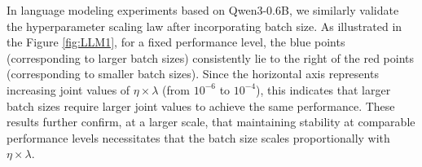 
In language modeling experiments based on Qwen3-0.6B, we similarly validate the hyperparameter scaling law after incorporating batch size. As illustrated in the Figure \ref{fig:LLM1}, for a fixed performance level, the blue points (corresponding to larger batch sizes) consistently lie to the right of the red points (corresponding to smaller batch sizes). Since the horizontal axis represents increasing joint values of $\eta\times\lambda$ (from $10^{-6}$ to $10^{-4}$), this indicates that larger batch sizes require larger joint values to achieve the same performance. These results further confirm, at a larger scale, that maintaining stability at comparable performance levels necessitates that the batch size scales proportionally with $\eta\times\lambda$. 